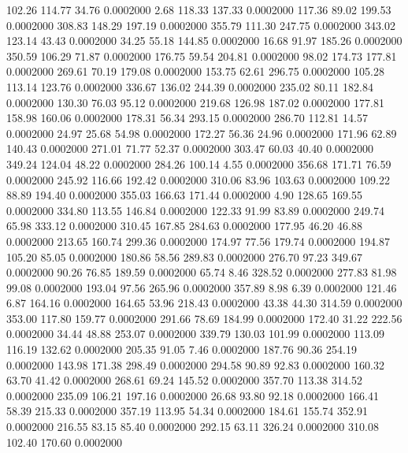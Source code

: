  102.26  114.77   34.76   0.0002000
   2.68  118.33  137.33   0.0002000
 117.36   89.02  199.53   0.0002000
 308.83  148.29  197.19   0.0002000
 355.79  111.30  247.75   0.0002000
 343.02  123.14   43.43   0.0002000
  34.25   55.18  144.85   0.0002000
  16.68   91.97  185.26   0.0002000
 350.59  106.29   71.87   0.0002000
 176.75   59.54  204.81   0.0002000
  98.02  174.73  177.81   0.0002000
 269.61   70.19  179.08   0.0002000
 153.75   62.61  296.75   0.0002000
 105.28  113.14  123.76   0.0002000
 336.67  136.02  244.39   0.0002000
 235.02   80.11  182.84   0.0002000
 130.30   76.03   95.12   0.0002000
 219.68  126.98  187.02   0.0002000
 177.81  158.98  160.06   0.0002000
 178.31   56.34  293.15   0.0002000
 286.70  112.81   14.57   0.0002000
  24.97   25.68   54.98   0.0002000
 172.27   56.36   24.96   0.0002000
 171.96   62.89  140.43   0.0002000
 271.01   71.77   52.37   0.0002000
 303.47   60.03   40.40   0.0002000
 349.24  124.04   48.22   0.0002000
 284.26  100.14    4.55   0.0002000
 356.68  171.71   76.59   0.0002000
 245.92  116.66  192.42   0.0002000
 310.06   83.96  103.63   0.0002000
 109.22   88.89  194.40   0.0002000
 355.03  166.63  171.44   0.0002000
   4.90  128.65  169.55   0.0002000
 334.80  113.55  146.84   0.0002000
 122.33   91.99   83.89   0.0002000
 249.74   65.98  333.12   0.0002000
 310.45  167.85  284.63   0.0002000
 177.95   46.20   46.88   0.0002000
 213.65  160.74  299.36   0.0002000
 174.97   77.56  179.74   0.0002000
 194.87  105.20   85.05   0.0002000
 180.86   58.56  289.83   0.0002000
 276.70   97.23  349.67   0.0002000
  90.26   76.85  189.59   0.0002000
  65.74    8.46  328.52   0.0002000
 277.83   81.98   99.08   0.0002000
 193.04   97.56  265.96   0.0002000
 357.89    8.98    6.39   0.0002000
 121.46    6.87  164.16   0.0002000
 164.65   53.96  218.43   0.0002000
  43.38   44.30  314.59   0.0002000
 353.00  117.80  159.77   0.0002000
 291.66   78.69  184.99   0.0002000
 172.40   31.22  222.56   0.0002000
  34.44   48.88  253.07   0.0002000
 339.79  130.03  101.99   0.0002000
 113.09  116.19  132.62   0.0002000
 205.35   91.05    7.46   0.0002000
 187.76   90.36  254.19   0.0002000
 143.98  171.38  298.49   0.0002000
 294.58   90.89   92.83   0.0002000
 160.32   63.70   41.42   0.0002000
 268.61   69.24  145.52   0.0002000
 357.70  113.38  314.52   0.0002000
 235.09  106.21  197.16   0.0002000
  26.68   93.80   92.18   0.0002000
 166.41   58.39  215.33   0.0002000
 357.19  113.95   54.34   0.0002000
 184.61  155.74  352.91   0.0002000
 216.55   83.15   85.40   0.0002000
 292.15   63.11  326.24   0.0002000
 310.08  102.40  170.60   0.0002000
